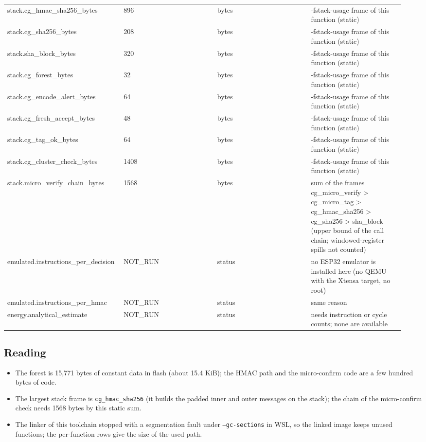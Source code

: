 {\begin{longtable}{p{0.237\linewidth}p{0.237\linewidth}p{0.237\linewidth}p{0.237\linewidth}}
stack.cg\_hmac\_sha256\_bytes & 896 & bytes & -fstack-usage frame of this function (static) \\
stack.cg\_sha256\_bytes & 208 & bytes & -fstack-usage frame of this function (static) \\
stack.sha\_block\_bytes & 320 & bytes & -fstack-usage frame of this function (static) \\
stack.cg\_forest\_bytes & 32 & bytes & -fstack-usage frame of this function (static) \\
stack.cg\_encode\_alert\_bytes & 64 & bytes & -fstack-usage frame of this function (static) \\
stack.cg\_fresh\_accept\_bytes & 48 & bytes & -fstack-usage frame of this function (static) \\
stack.cg\_tag\_ok\_bytes & 64 & bytes & -fstack-usage frame of this function (static) \\
stack.cg\_cluster\_check\_bytes & 1408 & bytes & -fstack-usage frame of this function (static) \\
stack.micro\_verify\_chain\_bytes & 1568 & bytes & sum of the frames cg\_micro\_verify > cg\_micro\_tag > cg\_hmac\_sha256 > cg\_sha256 > sha\_block (upper bound of the call chain; windowed-register spills not counted) \\
emulated.instructions\_per\_decision & NOT\_RUN & status & no ESP32 emulator is installed here (no QEMU with the Xtensa target, no root) \\
emulated.instructions\_per\_hmac & NOT\_RUN & status & same reason \\
energy.analytical\_estimate & NOT\_RUN & status & needs instruction or cycle counts; none are available \\
\bottomrule
\end{longtable}}

\subsection*{Reading}

\begin{itemize}
\item The forest is 15,771 bytes of constant data in flash (about 15.4 KiB); the HMAC path and the micro-confirm code are a few hundred bytes of code.
\item The largest stack frame is \texttt{cg\_hmac\_sha256} (it builds the padded inner and outer messages on the stack); the chain of the micro-confirm check needs 1568 bytes by this static sum.
\item The linker of this toolchain stopped with a segmentation fault under \texttt{--gc-sections} in WSL, so the linked image keeps unused functions; the per-function rows give the size of the used path.
\end{itemize}

